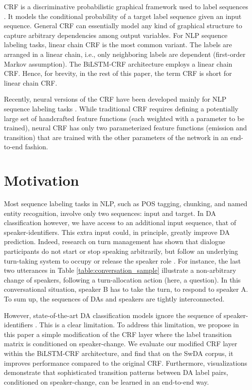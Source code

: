 \documentclass[11pt,a4paper]{article}
\begin{document}
CRF is a discriminative probabilistic graphical framework \citep{koller2009probabilistic,sutton2012introduction} used to label sequences \citep{lafferty2001conditional}.
It models the conditional probability of a target label sequence given an input sequence.
General CRF can essentially model any kind of graphical structure to capture arbitrary dependencies among output variables.
For NLP sequence labeling tasks, linear chain CRF is the most common variant.
The labels are arranged in a linear chain, i.e., only neighboring labels are dependent (first-order Markov assumption).
The BiLSTM-CRF architecture employs a linear chain CRF.
Hence, for brevity, in the rest of this paper, the term CRF is short for linear chain CRF.

Recently, neural versions of the CRF have been developed mainly for NLP sequence labeling tasks \citep{collobert2011natural,huang2015bidirectional,lample-etal-2016-neural}. 
While traditional CRF requires defining a potentially large set of handcrafted feature functions (each weighted with a parameter to be trained), neural CRF has only two parameterized feature functions (emission and transition) that are trained with the other parameters of the network in an end-to-end fashion.

\section{Motivation}
Most sequence labeling tasks in NLP, such as POS tagging, chunking, and named entity recognition, involve only two sequences: input and target.
In DA classification however, we have access to an additional input sequence, that of speaker-identifiers.
This extra input could, in principle, greatly improve DA prediction.
Indeed, research on turn management \citep{sacks1978simplest} has shown that dialogue participants do not start or stop speaking arbitrarily, but follow an underlying turn-taking system to occupy or release the speaker role \citep{petukhova2009s}.
For instance, the last two utterances in Table \ref{table:conversation_sample} illustrate a non-arbitrary change of speakers, following a turn-allocation action (here, a question).
In this conversational situation, speaker B has to take the turn, to respond to speaker A.
To sum up, the sequences of DAs and speakers are tightly interconnected.

However, state-of-the-art DA classification models ignore the sequence of speaker-identifiers \citep{kumar2018dialogue,chen2018dialogue,raheja-tetreault-2019-dialogue,li-etal-2019-dual}.
This is a clear limitation.
To address this limitation, we propose in this paper a simple modification of the CRF layer where the label transition matrix is conditioned on speaker-change.
We evaluate our modified CRF layer within the BiLSTM-CRF architecture, and find that on the SwDA corpus, it improves performance compared to the original CRF.
Furthermore, visualizations demonstrate that sophisticated transition patterns between DA label pairs, conditioned on speaker-change, can be learned in an end-to-end way.
\end{document}
